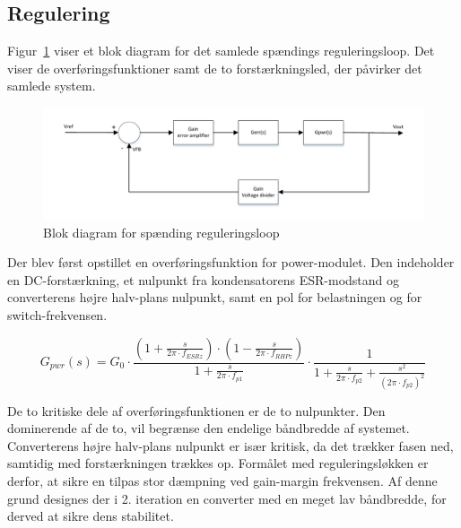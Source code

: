 
\subsection{Regulering}
Figur~\ref{fig:blokdiagram_regulering} viser et blok diagram for det samlede spændings reguleringsloop. Det viser de overføringsfunktioner samt de to forstærkningsled, der påvirker det samlede system.

\begin{figure}[H]
	\centering
	\includegraphics[width=1\linewidth]{../Dokumentation/tex/2iteration/billeder/Regulerings_blokdiagram.pdf}
	\caption{Blok diagram for spænding reguleringsloop}
	\label{fig:blokdiagram_regulering}
\end{figure}

\noindent Der blev først opstillet en overføringsfunktion for power-modulet\cite{UCC1801}. Den indeholder en DC-forstærkning, et nulpunkt fra kondensatorens ESR-modstand og converterens højre halv-plans nulpunkt, samt en pol for belastningen og for switch-frekvensen. 

\begin{equation} \label{H_Power}
G_{pwr}(s) = G_0 \cdot \frac{(1+\frac{s}{2\pi \cdot f_{ESRz}}) \cdot (1-\frac{s}{2\pi \cdot f_{RHPz}})}{1+\frac{s}{2\pi \cdot f_{p1}}} \cdot \frac{1}{1 + \frac{s}{2\pi \cdot f_{p2}} + \frac{s^2}{(2\pi \cdot f_{p2})^2}}
\end{equation}

De to kritiske dele af overføringsfunktionen er de to nulpunkter. Den dominerende af de to, vil begrænse den endelige båndbredde af systemet. Converterens højre halv-plans nulpunkt er især kritisk, da det trækker fasen ned, samtidig med forstærkningen trækkes op. Formålet med reguleringsløkken er derfor, at sikre en tilpas stor dæmpning ved gain-margin frekvensen. Af denne grund designes der i 2. iteration en converter med en meget lav båndbredde, for derved at sikre dens stabilitet.


